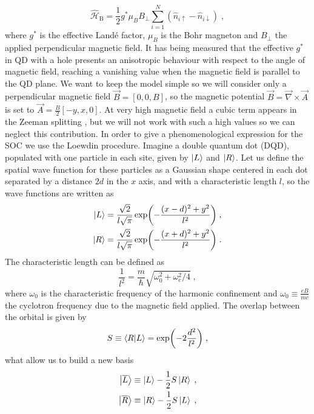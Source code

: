 \begin{equation}
	\hat{\mathcal{H}}_{\text{B}}=\frac{1}{2}g^*\mu_B B_\perp\sum_{i=1}^N(\hat{n}_{i\uparrow}-\hat{n}_{i\downarrow})\; ,
\end{equation}
where $g^*$ is the effective Landé factor, $\mu_B$ is the Bohr magneton and $B_\perp$ the applied perpendicular magnetic field. It has being measured that the effective $g^*$ in QD with a hole presents an anisotropic behaviour \cite{Wang2016} with respect to the angle of magnetic field, reaching a vanishing value when the magnetic field is parallel to the QD plane. We want to keep the model simple so we will consider only a perpendicular magnetic field $\vec{B}=[0,0,B]$, so the magnetic potential $\vec{B}=\vec{\nabla}\times\vec{A}$ is set to $\vec{A}=\frac{B}{2}[-y,x,0]$. At very high magnetic field a cubic term appears in the Zeeman splitting \cite{Hung2017}, but we will not work with such a high values so we can neglect this contribution. In order to give a phenomenological expression for the SOC we use the Loewdin procedure. Imagine a double quantum dot (DQD), populated with one particle in each site, given by $\ket{L}$ and $\ket{R}$. Let us define the spatial wave function for these particles as a Gaussian shape centered in each dot separated by a distance $2d$ in the $x$ axis, and with a characteristic length $l$, so the wave functions are written as
\begin{equation}
	\begin{split}
	\ket{L}&=\frac{\sqrt{2}}{l\sqrt{\pi}}\exp(-\frac{(x-d)^2+y^2}{l^2})\; ,\\
	\ket{R}&=\frac{\sqrt{2}}{l\sqrt{\pi}}\exp(-\frac{(x+d)^2+y^2}{l^2})\; .\\
	\end{split}
\end{equation}
The characteristic length can be defined as
\begin{equation}
	\frac{1}{l^2}=\frac{m}{\hbar}\sqrt{\omega_0^2+\omega_c^2/4}\; ,
\end{equation}
where $\omega_0$ is the characteristic frequency of the harmonic confinement and $\omega_0\equiv \frac{eB}{mc}$ the cyclotron frequency due to the magnetic field applied. The overlap between the orbital is given by
\begin{equation}
	S\equiv \braket{R}{L}=\exp(-2\frac{d^2}{l^2})\; ,
\end{equation}
what allow us to build a new basis
\begin{equation}
	\begin{split}
	\ket{\overline{L}}\equiv \ket{L}-\frac{1}{2}S\ket{R}\; ,\\
	\ket{\overline{R}}\equiv \ket{R}-\frac{1}{2}S\ket{L}\; ,\\
	\end{split}
\end{equation}
